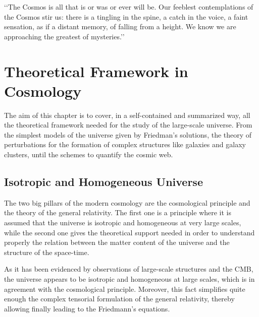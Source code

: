 \begin{savequote}[50mm]
‘‘The Cosmos is all that is or was or ever will be. Our feeblest contemplations 
of the Cosmos stir us: there is a tingling in the spine, a catch in the voice, 
a faint sensation, as if a distant memory, of falling from a height. We know 
we are approaching the greatest of mysteries.’’

\end{savequote}




\chapter{Theoretical Framework in Cosmology}
\label{cha:Theoretical Framework}


The aim of this chapter is to cover, in a self-contained and summarized 
way, all the theoretical framework needed for the study of the large-scale
universe. From the simplest models of the universe given by Friedman's 
solutions, the theory of perturbations for the formation of complex 
structures like galaxies and galaxy clusters, until the schemes to 
quantify the cosmic web.







\section{Isotropic and Homogeneous Universe}
\label{sec:IsotropicAndHomogeneousUniverse}


The two big pillars of the modern cosmology are the cosmological principle
and the theory of the general relativity. The first one is a principle 
where it is assumed that the universe is isotropic and homogeneous at very
large scales, while the second one gives the theoretical support needed in 
order to understand properly the relation between the matter content of 
the universe and the structure of the space-time.


As it has been evidenced by observations of large-scale structures and the 
CMB, the universe appears to be isotropic and homogeneous at large scales,
which is in agreement with the cosmological principle. Moreover, this fact
simplifies quite enough the complex tensorial formulation of the general
relativity, thereby allowing finally leading to the Friedmann's equations.



